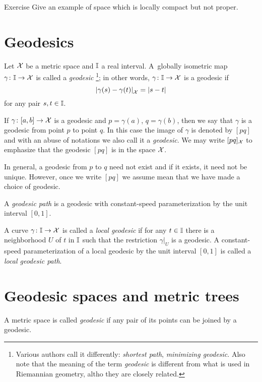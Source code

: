 \begin{thm}{Exercise}\label{ex:loc-compact-not-proper}
Give an example of space which is locally compact but not proper.
\end{thm}

\section{Geodesics}
\label{sec:geods}

Let $\mathcal{X}$ be a metric space 
and $\II$\index{$\II$} a real interval. 
A~globally isometric map $\gamma\colon\mathbb{I}\to \mathcal{X}$ is called a \emph{geodesic}%
\footnote{Various authors call it differently: {}\emph{shortest path}, {}\emph{minimizing geodesic}.
Also note that the meaning of the term \emph{geodesic} is different from what is used in Riemannian geometry, altho they are closely related.}; 
in other words, $\gamma\colon\mathbb{I}\to \mathcal{X}$ is a geodesic if 
\[\dist{\gamma(s)}{\gamma(t)}{\spc{X}}=|s-t|\]
for any pair $s,t\in \mathbb{I}$.

If $\gamma\colon[a,b]\to \mathcal{X}$ is a geodesic and $p=\gamma(a)$, $q=\gamma(b)$, then we say that $\gamma$ is a geodesic from point $p$ to point $q$.
In this case the image of $\gamma$ is denoted by $[p q]$\index{$[{*}{*}]$} and with an abuse of notations  we also call it a \emph{geodesic}.
We may write $[p q]_{\mathcal{X}}$ 
to emphasize that the geodesic $[p q]$ is in the space  ${\mathcal{X}}$.

In general, a geodesic from $p$ to $q$ need not exist and if it exists, it need not  be unique.  
However, once we write $[p q]$ we assume mean that we have made a choice of geodesic.

A \emph{geodesic path} is a geodesic with constant-speed parameterization by the unit interval $[0,1]$.

A curve $\gamma\colon\mathbb{I}\to \mathcal{X}$  is called a \emph{local geodesic} if for any $t\in\mathbb{I}$ there is a neighborhood $U$ of $t$ in $\II$ such that the restriction $\gamma|_U$ is a  geodesic.
A constant-speed parameterization of a local geodesic by the unit interval $[0,1]$ is called a \emph{local geodesic path}. 

\section{Geodesic spaces and metric trees}

A metric space is called \emph{geodesic} if any pair of its points can be joined by a geodesic.

